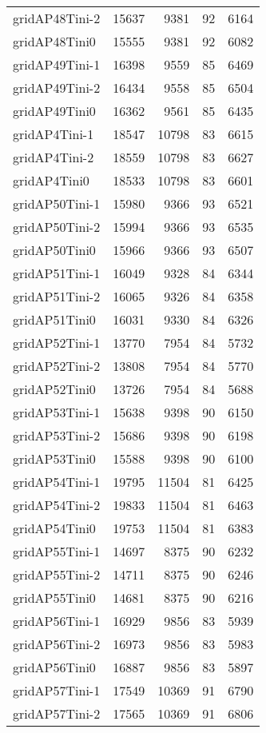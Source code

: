 \begin{longtable}{lrrrr}
gridAP48Tini-2 & 15637 & 9381 & 92 & 6164 \\
gridAP48Tini0 & 15555 & 9381 & 92 & 6082 \\
gridAP49Tini-1 & 16398 & 9559 & 85 & 6469 \\
gridAP49Tini-2 & 16434 & 9558 & 85 & 6504 \\
gridAP49Tini0 & 16362 & 9561 & 85 & 6435 \\
gridAP4Tini-1 & 18547 & 10798 & 83 & 6615 \\
gridAP4Tini-2 & 18559 & 10798 & 83 & 6627 \\
gridAP4Tini0 & 18533 & 10798 & 83 & 6601 \\
gridAP50Tini-1 & 15980 & 9366 & 93 & 6521 \\
gridAP50Tini-2 & 15994 & 9366 & 93 & 6535 \\
gridAP50Tini0 & 15966 & 9366 & 93 & 6507 \\
gridAP51Tini-1 & 16049 & 9328 & 84 & 6344 \\
gridAP51Tini-2 & 16065 & 9326 & 84 & 6358 \\
gridAP51Tini0 & 16031 & 9330 & 84 & 6326 \\
gridAP52Tini-1 & 13770 & 7954 & 84 & 5732 \\
gridAP52Tini-2 & 13808 & 7954 & 84 & 5770 \\
gridAP52Tini0 & 13726 & 7954 & 84 & 5688 \\
gridAP53Tini-1 & 15638 & 9398 & 90 & 6150 \\
gridAP53Tini-2 & 15686 & 9398 & 90 & 6198 \\
gridAP53Tini0 & 15588 & 9398 & 90 & 6100 \\
gridAP54Tini-1 & 19795 & 11504 & 81 & 6425 \\
gridAP54Tini-2 & 19833 & 11504 & 81 & 6463 \\
gridAP54Tini0 & 19753 & 11504 & 81 & 6383 \\
gridAP55Tini-1 & 14697 & 8375 & 90 & 6232 \\
gridAP55Tini-2 & 14711 & 8375 & 90 & 6246 \\
gridAP55Tini0 & 14681 & 8375 & 90 & 6216 \\
gridAP56Tini-1 & 16929 & 9856 & 83 & 5939 \\
gridAP56Tini-2 & 16973 & 9856 & 83 & 5983 \\
gridAP56Tini0 & 16887 & 9856 & 83 & 5897 \\
gridAP57Tini-1 & 17549 & 10369 & 91 & 6790 \\
gridAP57Tini-2 & 17565 & 10369 & 91 & 6806 \\

\end{longtable}
